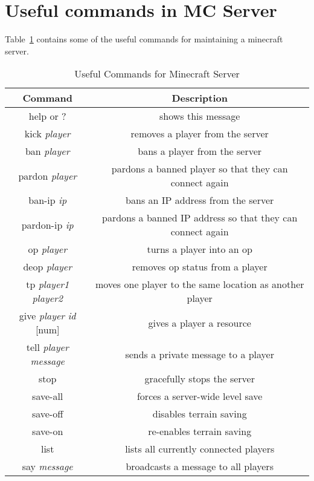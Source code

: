 \section{Useful commands in MC Server}

Table~\ref{tab:useful_mc} contains some of the useful commands for maintaining a minecraft server.

\begin{table}[!th]
\centering
\begin{tabular}{cc}
\hline
Command & Description\\
\hline
help  or  ? & shows this message\\
kick \textit{player} & removes a player from the server\\
ban \textit{player} & bans a player from the server\\
pardon \textit{player} & pardons a banned player so that they can connect again\\
ban-ip \textit{ip} & bans an IP address from the server\\
pardon-ip \textit{ip} & pardons a banned IP address so that they can connect again\\
op \textit{player} & turns a player into an op\\
deop \textit{player} & removes op status from a player\\
tp \textit{player1} \textit{player2} & moves one player to the same location as another player\\
give \textit{player} \textit{id} [num] & gives a player a resource\\
tell \textit{player} \textit{message} & sends a private message to a player\\
stop & gracefully stops the server\\
save-all & forces a server-wide level save\\
save-off & disables terrain saving\\
save-on & re-enables terrain saving\\
list & lists all currently connected players\\
say \textit{message} & broadcasts a message to all players\\
\hline
\end{tabular}
\caption{Useful Commands for Minecraft Server}
\label{tab:useful_mc}
\end{table}